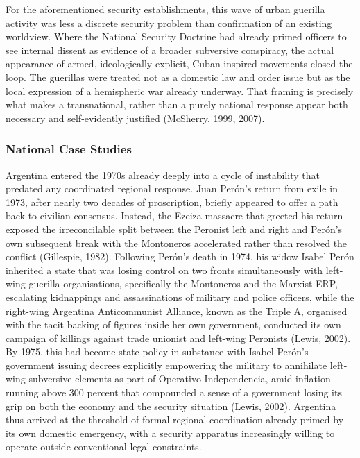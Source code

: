 For the aforementioned security establishments, this wave of urban guerilla activity was less a discrete security problem than confirmation of an existing worldview. Where the National Security Doctrine had already primed officers to see internal dissent as evidence of a broader subversive conspiracy, the actual appearance of armed, ideologically explicit, Cuban-inspired movements closed the loop. The guerillas were treated not as a domestic law and order issue but as the local expression of a hemispheric war already underway. That framing is precisely what makes a transnational, rather than a purely national response appear both necessary and self-evidently justified (McSherry, 1999, 2007).

\subsubsection{National Case Studies}


Argentina entered the 1970s already deeply into a cycle of instability that predated any coordinated regional response. Juan Perón’s return from exile in 1973, after nearly two decades of proscription, briefly appeared to offer a path back to civilian consensus. Instead, the Ezeiza massacre that greeted his return exposed the irreconcilable split between the Peronist left and right and Perón’s own subsequent break with the Montoneros accelerated rather than resolved the conflict (Gillespie, 1982). Following Perón's death in 1974, his widow Isabel Perón inherited a state that was losing control on two fronts simultaneously with left-wing guerilla organisations, specifically the Montoneros and the Marxist ERP, escalating kidnappings and assassinations of military and police officers, while the right-wing Argentina Anticommunist Alliance, known as the Triple A, organised with the tacit backing of figures inside her own government, conducted its own campaign of killings against trade unionist and left-wing Peronists (Lewis, 2002). By 1975, this had become state policy in substance with Isabel Perón's government issuing decrees explicitly empowering the military to annihilate left-wing subversive elements as part of Operativo Independencia, amid inflation running above 300 percent that compounded a sense of a government losing its grip on both the economy and the security situation (Lewis, 2002). Argentina thus arrived at the threshold of formal regional coordination already primed by its own domestic emergency, with a security apparatus increasingly willing to operate outside conventional legal constraints.

